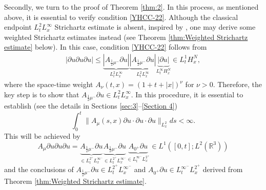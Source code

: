 \documentclass[11pt,twoside]{article}
\theoremstyle{plain}
\theoremstyle{definition}
\numberwithin{equation}{section}
\begin{document}
Secondly, we turn to the proof of Theorem \ref{thm:2}. In this process, as mentioned above, it is essential to verify condition \eqref{YHCC-22}.
Although the classical endpoint $L^2_t L^\infty_x$ Strichartz estimate is absent, inspired by \cite[Lemma 5.3]{HouYin2},
one may derive some weighted Strichartz estimates instead (see Theorem \ref{thm:Weighted Strichartz estimate} below).
In this case, condition \eqref{YHCC-22} follows from
\begin{equation*}
	\begin{split}
		|\partial u\partial u\partial u|\le
		\underbrace{|A_{\frac{1}{2}\mu^-} \partial u|}_{L^{2}_t L^{\infty}_x}
		\underbrace{|A_{\frac{1}{2}\mu^-} \partial u|}_{L^{2}_t L^{\infty}_x}
		\underbrace{|\partial u|}_{L^{\infty}_t H_x^{N}}
		\in  L_t^1H_x^N,
	\end{split}
\end{equation*}
where the space-time weight $A_{\nu}(t,x)= (1+t+|x|)^\nu$ for $\nu>0$.
Therefore, the key step is to show that $A_{\frac{1}{2}\mu^-} \partial u \in L^2_t L^\infty_x$. In this procedure,
it is essential to establish (see the details in Sections \ref{sec:3}--\ref{Section 4})
\begin{equation}\label{YHCC-26}
	\int_0^t \|A_{\mu}(s,x)\partial u\cdot \partial u\cdot \partial u\|_{L_x^2} ds<\infty.
\end{equation}
This will be achieved by
\begin{equation*}
A_{\mu}\partial u\partial u\partial u
=\underbrace{A_{\frac{1}{2}\mu^-}\partial u}_{\in L_t^{2^+}L_x^{\infty^-}}
\underbrace{A_{\frac{1}{2}\mu^-}\partial u}_{\in L_t^{2^+}L_x^{\infty^-}}
\underbrace{A_{0^+}\partial u}_{\in L_t^{\infty^-} L_x^{2^+}}\in  L^1([0,t];L^2(\mathbb{R}^3))
\end{equation*}
and the conclusions of $A_{\frac{1}{2}\mu^-} \partial u \in L_t^{2^+} L_x^{\infty^-}$ and $A_{0^+} \partial u \in L_t^{\infty^-} L_x^{2^+}$
derived from Theorem \ref{thm:Weighted Strichartz estimate}.
\end{document}
